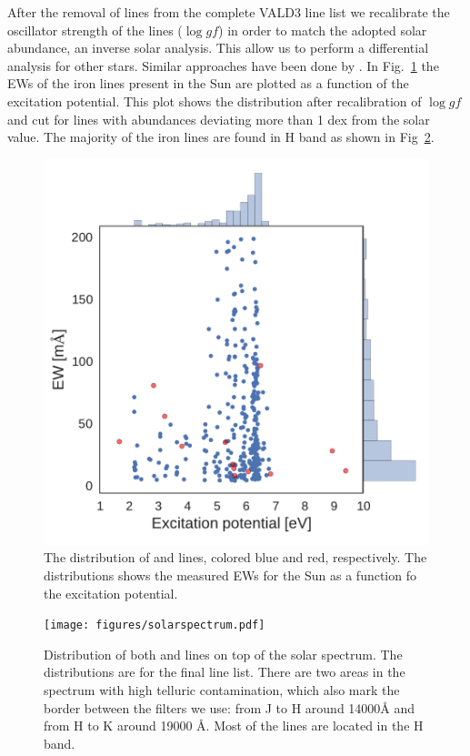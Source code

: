\documentclass{aa}
\begin{document}
After the removal of lines from the complete VALD3 line list we
recalibrate the oscillator strength of the lines ($\log \mathit{gf}$)
in order to match the adopted solar abundance, an inverse solar
analysis. This allow us to perform a differential analysis for other stars.
Similar approaches have been done by \citep{Sousa2008a,Onehag2012,Rhodin2015}.
In Fig.~\ref{fig:EWvsEP} the EWs of the iron lines present in
the Sun are plotted as a function of the excitation potential. This
plot shows the distribution after recalibration of $\log \mathit{gf}$ and cut
for lines with abundances deviating more than 1 dex from the solar
value. The majority of the iron lines are found in H band as shown in
Fig~\ref{fig:solarspectrum}.



\begin{figure}[tpb]
    \centering
    \includegraphics[width=1.0\linewidth]{figures/EWvsEP.pdf}
    \caption{The distribution of  and  lines,
    colored blue and red, respectively. The distributions shows
    the measured EWs for the Sun as a function fo the excitation
    potential.}
    \label{fig:EWvsEP}
\end{figure}


\begin{figure}[tpb]
    \centering
    \texttt{[image: figures/solarspectrum.pdf]}
    \caption{Distribution of both  and  lines on top of the solar
    spectrum. The distributions are for the final line list.
    There are two areas in the spectrum with high telluric
    contamination, which also mark the border between the filters we
    use: from J to H around 14000\si{\angstrom} and from H to K around
    19000 \si{\angstrom}. Most of the lines are located in the H band.}
    \label{fig:solarspectrum}
\end{figure}
\end{document}
